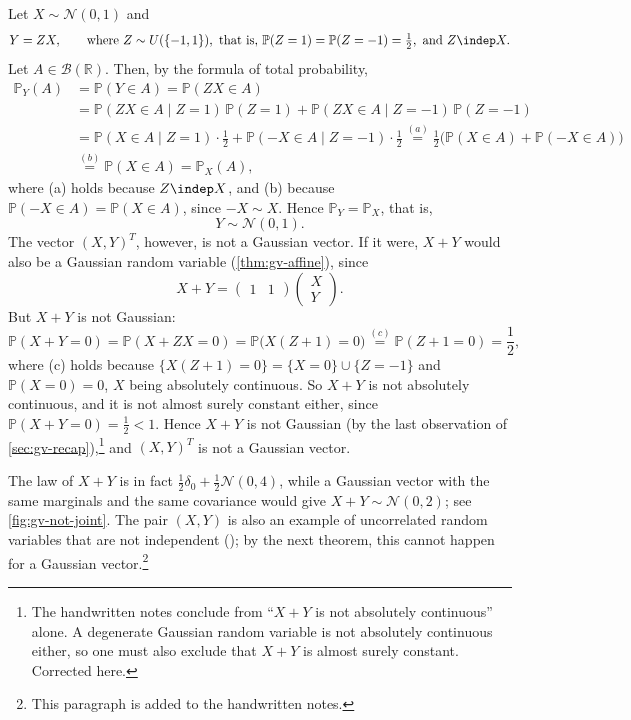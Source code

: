 \begin{example}\label{exa:gv-not-joint}
Let $X\sim\mathcal N(0,1)$ and
\[
  Y=ZX,\qquad\text{where }Z\sim U(\{-1,1\}),\ \text{that is, }\mathbb P(Z=1)=\mathbb P(Z=-1)=\tfrac12,
  \ \text{and }Z\indep X .
\]
Let $A\in\mathcal B(\mathbb R)$. Then, by the formula of total probability,
\[
\begin{aligned}
  \mathbb P_Y(A)&=\mathbb P(Y\in A)=\mathbb P(ZX\in A)\\
  &=\mathbb P(ZX\in A\mid Z=1)\,\mathbb P(Z=1)+\mathbb P(ZX\in A\mid Z=-1)\,\mathbb P(Z=-1)\\
  &=\mathbb P(X\in A\mid Z=1)\cdot\frac12+\mathbb P(-X\in A\mid Z=-1)\cdot\frac12
  \overset{(a)}{=}\frac12\big(\mathbb P(X\in A)+\mathbb P(-X\in A)\big)\\
  &\overset{(b)}{=}\mathbb P(X\in A)=\mathbb P_X(A),
\end{aligned}
\]
where (a) holds because $Z\indep X$, and (b) because $\mathbb P(-X\in A)=\mathbb P(X\in A)$, since
$-X\sim X$. Hence $\mathbb P_Y=\mathbb P_X$, that is,
\[
  Y\sim\mathcal N(0,1).
\]
The vector $(X,Y)^T$, however, is not a Gaussian vector. If it were, $X+Y$ would also be a
Gaussian random variable (\cref{thm:gv-affine}), since
\[
  X+Y=\begin{pmatrix}1&1\end{pmatrix}\begin{pmatrix}X\\Y\end{pmatrix}.
\]
But $X+Y$ is not Gaussian:
\[
  \mathbb P(X+Y=0)=\mathbb P(X+ZX=0)=\mathbb P\big(X(Z+1)=0\big)\overset{(c)}{=}\mathbb P(Z+1=0)=\frac12,
\]
where (c) holds because $\{X(Z+1)=0\}=\{X=0\}\cup\{Z=-1\}$ and $\mathbb P(X=0)=0$, $X$ being
absolutely continuous. So $X+Y$ is not absolutely continuous, and it is not almost surely constant
either, since $\mathbb P(X+Y=0)=\frac12<1$. Hence $X+Y$ is not Gaussian (by the last observation of
\cref{sec:gv-recap}),\footnote{The handwritten notes conclude from ``$X+Y$ is not absolutely
continuous'' alone. A degenerate Gaussian random variable is not absolutely continuous either, so
one must also exclude that $X+Y$ is almost surely constant. Corrected here.} and $(X,Y)^T$ is not a
Gaussian vector.
\end{example}

The law of $X+Y$ is in fact $\frac12\delta_0+\frac12\mathcal N(0,4)$, while a Gaussian vector with
the same marginals and the same covariance would give $X+Y\sim\mathcal N(0,2)$; see
\cref{fig:gv-not-joint}. The pair $(X,Y)$ is also an example of uncorrelated random variables that
are not independent (); by the next theorem, this cannot happen for a
Gaussian vector.\footnote{This paragraph is added to the handwritten notes.}

